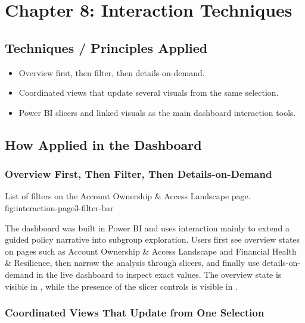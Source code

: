 \documentclass[../main.tex]{subfiles}
\begin{document}
\section{Chapter 8: Interaction Techniques}
\label{sec:chapter8-interaction-techniques}

\subsection{Techniques / Principles Applied}

\begin{itemize}[leftmargin=*]
\item Overview first, then filter, then details-on-demand.
\item Coordinated views that update several visuals from the same selection.
\item Power BI slicers and linked visuals as the main dashboard interaction
tools.
\end{itemize}

\subsection{How Applied in the Dashboard}

\subsubsection{Overview First, Then Filter, Then Details-on-Demand}

{List of filters on the Account Ownership \& Access Landscape page.}
{fig:interaction-page3-filter-bar}

The dashboard was built in Power BI and uses interaction mainly to extend a
guided policy narrative into subgroup exploration. Users first see overview
states on pages such as Account Ownership \& Access Landscape and Financial
Health \& Resilience, then narrow the analysis through slicers, and finally use
details-on-demand in the live dashboard to inspect exact values. The overview
state is visible in , while the
presence of the slicer controls is visible in
.

\subsubsection{Coordinated Views That Update from One Selection}
\end{document}
